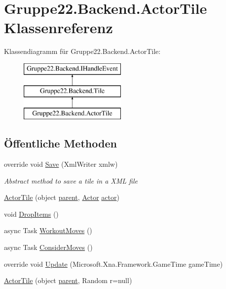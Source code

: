\hypertarget{class_gruppe22_1_1_backend_1_1_actor_tile}{\section{Gruppe22.\-Backend.\-Actor\-Tile Klassenreferenz}
\label{class_gruppe22_1_1_backend_1_1_actor_tile}
}
Klassendiagramm für Gruppe22.\-Backend.\-Actor\-Tile\-:\begin{figure}[H]
\begin{center}
\leavevmode
\includegraphics[height=3.000000cm]{class_gruppe22_1_1_backend_1_1_actor_tile}
\end{center}
\end{figure}
\subsection*{Öffentliche Methoden}
\begin{DoxyCompactItemize}
\item 
override void \hyperlink{class_gruppe22_1_1_backend_1_1_actor_tile_aad98091f10ca75642d211c1a837141e4}{Save} (Xml\-Writer xmlw)
\begin{DoxyCompactList}\small\item\em Abstract method to save a tile in a X\-M\-L file \end{DoxyCompactList}\item 
\hyperlink{class_gruppe22_1_1_backend_1_1_actor_tile_a1cf18c7c4d72100e5c60288e5b339dce}{Actor\-Tile} (object \hyperlink{class_gruppe22_1_1_backend_1_1_tile_abc12933c70eb3a2ebbb2fde9f45c2632}{parent}, \hyperlink{class_gruppe22_1_1_backend_1_1_actor}{Actor} \hyperlink{class_gruppe22_1_1_backend_1_1_actor_tile_a77ed5b0b9c6dd777a4a6242d4f3b5447}{actor})
\item 
void \hyperlink{class_gruppe22_1_1_backend_1_1_actor_tile_ab195619cedce5db86ed45978a6522a18}{Drop\-Items} ()
\item 
async Task \hyperlink{class_gruppe22_1_1_backend_1_1_actor_tile_a6f14e702f9cba241925195d13c54e6e5}{Workout\-Moves} ()
\item 
async Task \hyperlink{class_gruppe22_1_1_backend_1_1_actor_tile_af8bb4de8899a0b704b08e285efefed24}{Consider\-Moves} ()
\item 
override void \hyperlink{class_gruppe22_1_1_backend_1_1_actor_tile_a3e87be522214c2ab00966717c86f9af1}{Update} (Microsoft.\-Xna.\-Framework.\-Game\-Time game\-Time)
\item 
\hyperlink{class_gruppe22_1_1_backend_1_1_actor_tile_a9cb65b2c7c2c76fd2862bcc80f71c09d}{Actor\-Tile} (object \hyperlink{class_gruppe22_1_1_backend_1_1_tile_abc12933c70eb3a2ebbb2fde9f45c2632}{parent}, Random r=null)
\end{DoxyCompactItemize}
